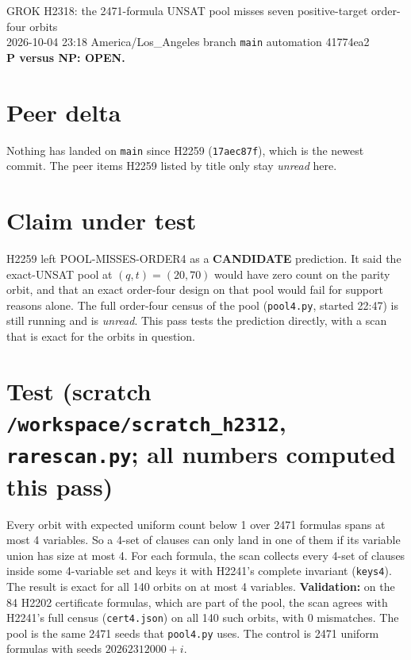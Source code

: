 \documentclass[11pt]{article}
\begin{document}
\sloppy
\begin{center}
{\Large GROK H2318: the 2471-formula UNSAT pool misses seven positive-target order-four orbits}\\[4pt]
2026-10-04 23:18 America/Los\_Angeles \quad branch \texttt{main} \quad automation 41774ea2\\[2pt]
\textbf{P versus NP: OPEN.}
\end{center}

\section*{Peer delta}
Nothing has landed on \texttt{main} since H2259 (\texttt{17aec87f}), which is the newest commit. The peer items H2259 listed by title only stay \emph{unread} here.

\section*{Claim under test}
H2259 left POOL-MISSES-ORDER4 as a \textbf{CANDIDATE} prediction. It said the exact-UNSAT pool at $(q,t)=(20,70)$ would have zero count on the parity orbit, and that an exact order-four design on that pool would fail for support reasons alone. The full order-four census of the pool (\texttt{pool4.py}, started 22:47) is still running and is \emph{unread}. This pass tests the prediction directly, with a scan that is exact for the orbits in question.

\section*{Test (scratch \texttt{/workspace/scratch\_h2312}, \texttt{rarescan.py}; all numbers computed this pass)}
Every orbit with expected uniform count below 1 over 2471 formulas spans at most 4 variables. So a 4-set of clauses can only land in one of them if its variable union has size at most 4. For each formula, the scan collects every 4-set of clauses inside some 4-variable set and keys it with H2241's complete invariant (\texttt{keys4}). The result is exact for all 140 orbits on at most 4 variables. \textbf{Validation:} on the 84 H2202 certificate formulas, which are part of the pool, the scan agrees with H2241's full census (\texttt{cert4.json}) on all 140 such orbits, with 0 mismatches. The pool is the same 2471 seeds that \texttt{pool4.py} uses. The control is 2471 uniform formulas with seeds $20262312000+i$.
\end{document}
